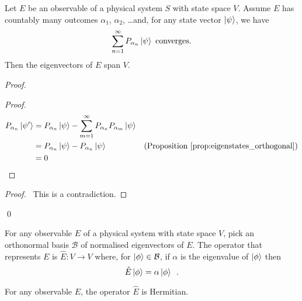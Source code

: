 \begin{prop}
Let $E$ be an observable of a physical system $S$ with state space $V$. Assume $E$ has countably many outcomes $\alpha_1$, $\alpha_2$, \ldots and, for any state vector $\left| {\psi} \right\rangle$, we have
\[ \sum_{n=1}^\infty P_{\alpha_n} \left| {\psi} \right\rangle \text{ converges}. \]
Then the eigenvectors of $E$ span $V$.
\end{prop}

\begin{proof}
\pf
{}
\begin{proof}
	\pf
	\begin{align*}
		P_{\alpha_n} \left| {\psi'} \right\rangle & = P_{\alpha_n} \left| {\psi} \right\rangle - \sum_{m=1}^\infty P_{\alpha_n} P_{\alpha_m} \left| {\psi} \right\rangle \\
		& = P_{\alpha_n} \left| {\psi} \right\rangle - P_{\alpha_n} \left| {\psi} \right\rangle & (\text{Proposition \ref{prop:eigenstates_orthogonal}}) \\
		& = 0
	\end{align*}
\end{proof}
\qedstep
\begin{proof}
	\pf\ This is a contradiction.
\end{proof}
\qed
\end{proof}

\begin{df}
For any observable $E$ of a physical system with state space $V$, pick an orthonormal basis $\mathcal{B}$ of normalised eigenvectors of $E$. The operator that represents $E$ is $\hat{E} : V \rightarrow V$ where, for $\left| {\phi} \right\rangle \in \mathcal{B}$, if $\alpha$ is the eigenvalue of $\left| {\phi} \right\rangle$ then
\[ \hat{E} \left| {\phi} \right\rangle = \alpha \left| {\phi} \right\rangle \enspace . \]
\end{df}

\begin{prop}
For any observable $E$, the operator $\hat{E}$ is Hermitian.
\end{prop}

